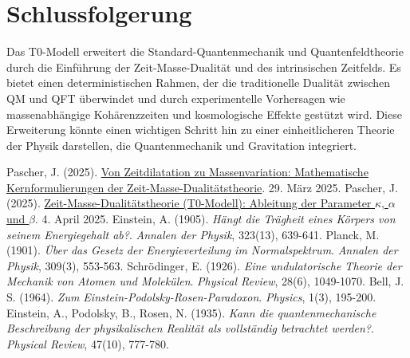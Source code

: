 \documentclass{article}
\begin{document}
	\section{Schlussfolgerung}
	Das T0-Modell erweitert die Standard-Quantenmechanik und Quantenfeldtheorie durch die Einführung der Zeit-Masse-Dualität und des intrinsischen Zeitfelds. Es bietet einen deterministischen Rahmen, der die traditionelle Dualität zwischen QM und QFT überwindet und durch experimentelle Vorhersagen wie massenabhängige Kohärenzzeiten und kosmologische Effekte gestützt wird. Diese Erweiterung könnte einen wichtigen Schritt hin zu einer einheitlicheren Theorie der Physik darstellen, die Quantenmechanik und Gravitation integriert.
	
	\begin{thebibliography}{99}
		 Pascher, J. (2025). \href{https://github.com/jpascher/T0-Time-Mass-Duality/tree/main/2/pdf/Deutsch/MathZeitMasseLagrange.pdf}{Von Zeitdilatation zu Massenvariation: Mathematische Kernformulierungen der Zeit-Masse-Dualitätstheorie}. 29. März 2025.
		 Pascher, J. (2025). \href{https://github.com/jpascher/T0-Time-Mass-Duality/tree/main/2/pdf/Deutsch/ZeitMasseT0Params.pdf}{Zeit-Masse-Dualitätstheorie (T0-Modell): Ableitung der Parameter \(\kappa\), \(\alpha\) und \(\beta\)}. 4. April 2025.
		 Einstein, A. (1905). \textit{Hängt die Trägheit eines Körpers von seinem Energiegehalt ab?}. \textit{Annalen der Physik}, 323(13), 639-641.
		 Planck, M. (1901). \textit{Über das Gesetz der Energieverteilung im Normalspektrum}. \textit{Annalen der Physik}, 309(3), 553-563.
		 Schrödinger, E. (1926). \textit{Eine undulatorische Theorie der Mechanik von Atomen und Molekülen}. \textit{Physical Review}, 28(6), 1049-1070.
		 Bell, J. S. (1964). \textit{Zum Einstein-Podolsky-Rosen-Paradoxon}. \textit{Physics}, 1(3), 195-200.
		 Einstein, A., Podolsky, B., Rosen, N. (1935). \textit{Kann die quantenmechanische Beschreibung der physikalischen Realität als vollständig betrachtet werden?}. \textit{Physical Review}, 47(10), 777-780.
	\end{thebibliography}
	
\end{document}
